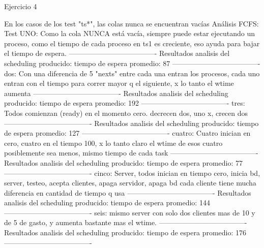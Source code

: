 
\begin{section}{Ejercicio 4}

En los casos de los test "ts*", las colas nunca se encuentran vacías
Análisis FCFS:
	Test UNO:
		Como la cola NUNCA está vacía, siempre puede estar ejecutando un proceso, como el tiempo de cada proceso en ts1 es creciente, eso ayuda para bajar el tiempo de espera.
	-------------------------------------
	Resultados analisis del scheduling producido:
	tiempo de espera promedio: 87
	-------------------------------------
dos:
	Con una diferencia de 5 "nexts" entre cada una entran los procesos, cada uno entran con el tiempo para correr mayor q el siguiente, x lo tanto el wtime aumenta
	-------------------------------------
	Resultados analisis del scheduling producido:
	tiempo de espera promedio: 192
	-------------------------------------
tres:
	Todos comienzan (ready) en el momento cero. decrecen dos, uno x, crecen dos
	-------------------------------------
	Resultados analisis del scheduling producido:
	tiempo de espera promedio: 127
	-------------------------------------
cuatro:
	Cuatro inician en cero, cuatro en el tiempo 100, x lo tanto claro el wtime de esos cuatro posiblemente sea menos, mismo tiempo de cada task
	-------------------------------------
	Resultados analisis del scheduling producido:
	tiempo de espera promedio: 77
	-------------------------------------
cinco:
	Server, todos inician en tiempo cero, inicia bd, server, testeo, acepta clientes, apaga servidor, apaga bd
	cada cliente tiene mucha diferencia en cantidad de tiempo q usa
	-------------------------------------
	Resultados analisis del scheduling producido:
	tiempo de espera promedio: 144
	-------------------------------------
seis:
	mismo server con solo dos clientes mas de 10 y de 5 de gasto, y aumenta bastante mas el wtime.
	-------------------------------------
	Resultados analisis del scheduling producido:
	tiempo de espera promedio: 176
	-------------------------------------


\end{section}

